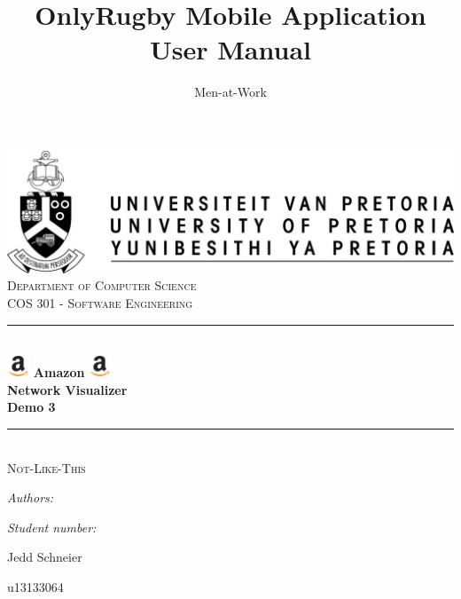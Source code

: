 \documentclass[hidelinks,a4paper,12pt]{article}
\author{Men-at-Work}
\title{ OnlyRugby Mobile Application User Manual}
\newcommand{\HRule}{\rule{\linewidth}{0.5mm}}
\begin{document}
\setlength{\parskip}{6pt}

\begin{titlepage}

\begin{center}
\includegraphics[width=1\textwidth]{./images/up-logo.jpg}\\[0.4cm]    
\textsc{\LARGE Department of Computer Science}\\[1.5cm]
\textsc{\Large COS 301 - Software Engineering}\\[0.5cm]
\HRule \\[0.4cm]
\includegraphics[width=0.05\textwidth]{./images/logo.jpg} 
{ \huge \bfseries Amazon}
\includegraphics[width=0.05\textwidth]{./images/logo.jpg}\\[0.4cm] 
{ \huge \bfseries Network Visualizer}\\[0.4cm]
{ \huge \bfseries Demo 3}\\[0.4cm]
\HRule \\[0.4cm]
\textsc{\Large Not-Like-This}\\[0.5cm]
\begin{minipage}{0.4\textwidth}
\begin{flushleft} \large
\emph{Authors:}
\end{flushleft}
\end{minipage}
\begin{minipage}{0.4\textwidth}
\begin{flushright} \large
\emph{Student number:}
\end{flushright}
\end{minipage}

\begin{minipage}{0.4\textwidth}
\begin{flushleft} \large
Jedd {Schneier}
\end{flushleft}
\end{minipage}
\begin{minipage}{0.4\textwidth}
\begin{flushright} \large
\emph{}
u13133064
\end{flushright}
\end{minipage}


\end{center}
\end{titlepage}
\end{document}
